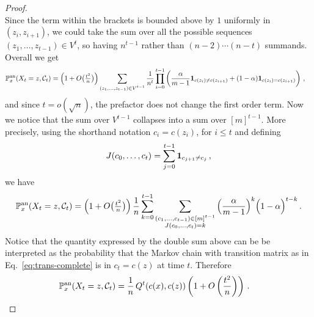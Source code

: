 \documentclass[11pt,oneside]{amsart}
\numberwithin{equation}{section}  %
\theoremstyle{plain}
\newcommand{\p}{\mathbb{P}}
\newcommand{\one}{\textup{\textbf{1}}}
\newcommand{\pan}{\p^{\textup{an}}}
\newcommand{\semi}{{Q}}
\begin{document}
\begin{proof}
\begin{equation*}
	\end{equation*}
	Since the term within the  brackets is bounded above by $1$ uniformly in $(z_i,z_{i+1})$, we could take the sum over all the possible sequences $(z_1,\dots,z_{t-1})\in V^t$, so having $n^{t-1}$ rather than $(n-2)\cdots(n-t)$ summands. Overall we get
	 \begin{equation*}
	 	\begin{split}
	 		\pan_x(X_t=z , \mathcal{C}_t)&
	 		= 
	 		\left(1+O\big(\tfrac {t^2}n\big)\right)\sum_{\substack{(z_1, \dots, z_{t-1}) \in V^{t-1} }} 
	 		\frac{1}{n^t}\prod_{i=0}^{t-1} \left(\frac{\alpha}{m-1}\one_{c(z_i)\neq c(z_{i+1})}+(1-\alpha)\one_{c(z_i)= c(z_{i+1})} \right)\,,
	 	\end{split}
	 \end{equation*}
and since $t=o(\sqrt{n})$, the prefactor does not change the first order term.
Now we notice that the sum over $V^{t-1}$ collapses into a sum over $[m]^{t-1}$. More precisely, using the shorthand notation $c_i=c(z_i)$, for $i\le t$ and defining 
$$J(c_0,\dots,c_t)=\sum_{j =0}^{t-1}\one_{c_{j+1}\neq c_j}\,,$$ we have
\begin{equation}
\pan_x(X_t=z,\mathcal{C}_t)=\left(1+O\big(\tfrac{t^2}{n}\big)\right)
\frac{1}{n} \sum_{k=0}^{t-1}\sum_{\substack{(c_1,\dots,c_{t-1})\in[m]^{t-1} \\ J(c_0,\dots,c_t)=k}}
\Big(\frac{\alpha}{m-1}\Big)^{k}
\Big(1-\alpha\Big)^{t-k}\,.
\end{equation}
Notice that 
the quantity expressed by the double sum above can be be interpreted as the probability that the Markov chain with transition matrix as in Eq.~\eqref{eq:trans-complete}
is in $c_t=c(z)$ at time $t$.
Therefore
\begin{equation}
\begin{split}
\pan_x(X_t=z,\mathcal{C}_t)
&=\frac{1}{n}\, \semi^ t(c(x),c(z))\left(1+O\left(\frac{t^2}{n}\right)\right)\,. \qedhere
\end{split}
\end{equation}
%
\end{proof}
\end{document}
